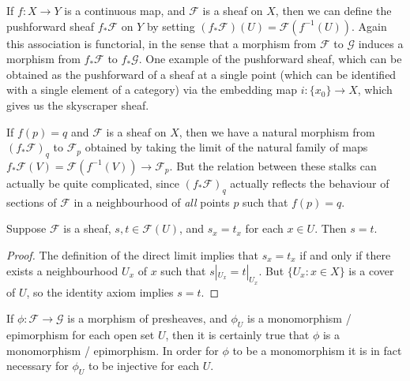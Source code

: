 \begin{example}
    If $f: X \to Y$ is a continuous map, and $\mathcal{F}$ is a sheaf on $X$, then we can define the pushforward sheaf $f_* \mathcal{F}$ on $Y$ by setting $(f_* \mathcal{F})(U) = \mathcal{F}(f^{-1}(U))$. Again this association is functorial, in the sense that a morphism from $\mathcal{F}$ to $\mathcal{G}$ induces a morphism from $f_* \mathcal{F}$ to $f_* \mathcal{G}$. One example of the pushforward sheaf, which can be obtained as the pushforward of a sheaf at a single point (which can be identified with a single element of a category) via the embedding map $i: \{ x_0 \} \to X$, which gives us the skyscraper sheaf.

    If $f(p) = q$ and $\mathcal{F}$ is a sheaf on $X$, then we have a natural morphism from $(f_* \mathcal{F})_q$ to $\mathcal{F}_p$ obtained by taking the limit of the natural family of maps $f_* \mathcal{F}(V) = \mathcal{F}(f^{-1}(V)) \to \mathcal{F}_p$. But the relation between these stalks can actually be quite complicated, since $(f_* \mathcal{F})_q$ actually reflects the behaviour of sections of $\mathcal{F}$ in a neighbourhood of \emph{all} points $p$ such that $f(p) = q$. 
\end{example}

\begin{lemma}
    Suppose $\mathcal{F}$ is a sheaf, $s,t \in \mathcal{F}(U)$, and $s_x = t_x$ for each $x \in U$. Then $s = t$.
\end{lemma}
\begin{proof}
    The definition of the direct limit implies that $s_x = t_x$ if and only if there exists a neighbourhood $U_x$ of $x$ such that $s|_{U_x} = t|_{U_x}$. But $\{ U_x : x \in X \}$ is a cover of $U$, so the identity axiom implies $s = t$.
\end{proof}

If $\phi: \mathcal{F} \to \mathcal{G}$ is a morphism of presheaves, and $\phi_U$ is a monomorphism / epimorphism for each open set $U$, then it is certainly true that $\phi$ is a monomorphism / epimorphism. In order for $\phi$ to be a monomorphism it is in fact necessary for $\phi_U$ to be injective for each $U$.

